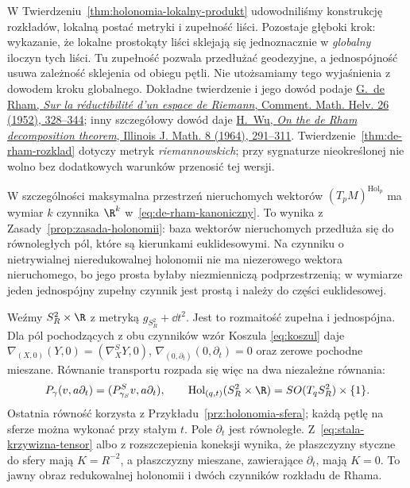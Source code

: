 W Twierdzeniu~\ref{thm:holonomia-lokalny-produkt}
udowodniliśmy konstrukcję rozkładów, lokalną postać
metryki i zupełność liści. Pozostaje głęboki krok:
wykazanie, że lokalne prostokąty liści sklejają się
jednoznacznie w \emph{globalny} iloczyn tych liści.
Tu zupełność pozwala przedłużać geodezyjne, a
jednospójność usuwa zależność sklejenia od obiegu
pętli. Nie utożsamiamy tego wyjaśnienia z dowodem
kroku globalnego. Dokładne twierdzenie i jego dowód
podaje \href{https://doi.org/10.1007/BF02564308}
{G.~de Rham, \emph{Sur la réductibilité d'un espace de Riemann},
Comment. Math. Helv. 26 (1952), 328--344};
inny szczegółowy dowód daje
\href{https://doi.org/10.1215/ijm/1256059674}
{H.~Wu, \emph{On the de Rham decomposition theorem},
Illinois J. Math. 8 (1964), 291--311}.
Twierdzenie~\ref{thm:de-rham-rozklad} dotyczy metryk
\emph{riemannowskich}; przy sygnaturze nieokreślonej
nie wolno bez dodatkowych warunków przenosić tej wersji.

W szczególności maksymalna przestrzeń nieruchomych
wektorów $(T_pM)^{\operatorname{Hol}_p}$ ma wymiar $k$
czynnika $\R^k$ w~\eqref{eq:de-rham-kanoniczny}.
To wynika z Zasady~\ref{prop:zasada-holonomii}:
baza wektorów nieruchomych przedłuża się do równoległych
pól, które są kierunkami euklidesowymi. Na czynniku
o nietrywialnej nieredukowalnej holonomii nie ma
niezerowego wektora nieruchomego, bo jego prosta byłaby
niezmienniczą podprzestrzenią; w wymiarze jeden
jednospójny zupełny czynnik jest prostą i należy
do części euklidesowej.

\begin{przyklad}
\label{prz:de-rham-sfera-prosta}
Weźmy $S_R^2\times\R$ z metryką $g_{S_R^2}+\dd t^2$.
Jest to rozmaitość zupełna i jednospójna. Dla pól
pochodzących z obu czynników wzór Koszula
\eqref{eq:koszul} daje
$\nabla_{(X,0)}(Y,0)=(\nabla^{S}_XY,0)$,
$\nabla_{(0,\partial_t)}(0,\partial_t)=0$
oraz zerowe pochodne mieszane. Równanie transportu
rozpada się więc na dwa niezależne równania:
\[
 P_{\gamma}(v,a\partial_t)
   =(P_{\gamma_S}^{S}v,a\partial_t),
 \qquad
 \operatorname{Hol}_{(q,t)}(S_R^2\times\R)
      =SO(T_qS_R^2)\times\{1\}.
\]
Ostatnia równość korzysta z
Przykładu~\ref{prz:holonomia-sfera}; każdą pętlę
na sferze można wykonać przy stałym $t$.
Pole $\partial_t$ jest równoległe. Z~\eqref{eq:stala-krzywizna-tensor}
albo z rozszczepienia koneksji wynika, że płaszczyzny
styczne do sfery mają $K=R^{-2}$, a płaszczyzny
mieszane, zawierające $\partial_t$, mają $K=0$.
To jawny obraz redukowalnej holonomii i dwóch czynników
rozkładu de Rhama.
\end{przyklad}

